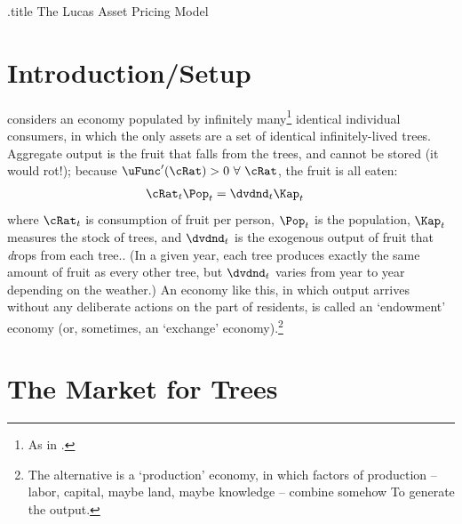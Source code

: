 \documentclass{handout}
\begin{document}
\handoutHeader

\begin{verbatimwrite}{\jobname.title}
The Lucas Asset Pricing Model
\end{verbatimwrite}

\handoutNameMake

\section{Introduction/Setup}
\cite{lucas:assetpricing} considers an economy populated by infinitely many\footnote{As in \Aggregation.}  identical individual consumers, in which the only assets are a set of identical infinitely-lived trees.  Aggregate output is the fruit that falls from the trees, and cannot be stored (it would rot!); because $\uFunc^{\prime}(\cRat)>0~\forall~\cRat$, the fruit is all eaten:
\begin{equation}\begin{gathered}\begin{aligned}
\cRat_{t}\Pop_{t} & =  \dvdnd_{t}\Kap_{t} \label{eq:CeqY}
\end{aligned}\end{gathered}\end{equation}
where $\cRat_{t}$ is consumption of fruit per person, $\Pop_{t}$ is the population, $\Kap_{t}$ measures the stock of trees, and $\dvdnd_{t}$ is the exogenous output of fruit that \textit{d}rops from each tree..  (In a given year, each tree produces exactly the same amount of fruit as every other tree, but $\dvdnd_{t}$ varies from year to year depending on the weather.)  An economy like this, in which output arrives without any deliberate actions on the part of residents, is called an `endowment' economy (or, sometimes, an `exchange' economy).\footnote{The alternative is a `production' economy, in which factors of production -- labor, capital, maybe land, maybe knowledge -- combine somehow To generate the output.}   

\hypertarget{The-Market-for-Trees}{}
\section{The Market for Trees}
\end{document}
